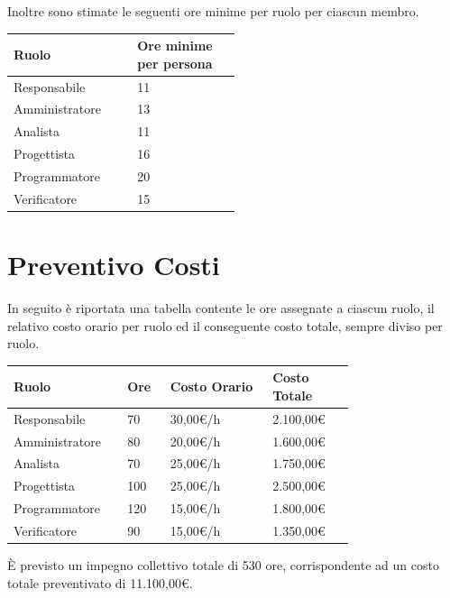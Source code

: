 \documentclass[a4paper,12pt]{article}
\begin{document}
Inoltre sono stimate le seguenti ore minime per ruolo per ciascun membro.
\space
\begin{center}
    \small
    \renewcommand{\arraystretch}{1.2}
    \begin{tabular}{|p{0.20\linewidth}|p{0.30\linewidth}|}
        \hline
        \rowcolor{gray!60}
        \textbf{Ruolo} & \textbf{Ore minime per persona}\\
        \hline
        \rowcolor{white}
        Responsabile & 11 \\
        \hline
        \rowcolor{gray!20}
        Amministratore & 13 \\
        \hline
        \rowcolor{white}
        Analista & 11 \\
        \hline
        \rowcolor{gray!20}
        Progettista & 16 \\
        \hline
        \rowcolor{white}
        Programmatore & 20 \\
        \hline
        \rowcolor{gray!20}
        Verificatore & 15 \\
        \hline
    \end{tabular}
\end{center}
\section{Preventivo Costi}
In seguito è riportata una tabella contente le ore assegnate a ciascun ruolo, il relativo costo orario per ruolo ed il conseguente costo totale, sempre diviso per ruolo.
\begin{center}
    \small
    \renewcommand{\arraystretch}{1.2} 
    \begin{tabular}{|p{0.20\linewidth}|p{0.10\linewidth}|p{0.25\linewidth}|p{0.20\linewidth}|}
        \hline
        \rowcolor{gray!60} 
        \textbf{Ruolo} & \textbf{Ore} & \textbf{Costo Orario} & \textbf{Costo Totale} \\
        \hline
        \rowcolor{white}
        Responsabile & 70 & 30,00€/h & 2.100,00€\\
        \hline
        \rowcolor{gray!20}
        Amministratore & 80 & 20,00€/h & 1.600,00€\\
        \hline
        \rowcolor{white}
        Analista & 70 & 25,00€/h & 1.750,00€\\
        \hline
        \rowcolor{gray!20}
        Progettista & 100 & 25,00€/h & 2.500,00€\\
        \hline
        \rowcolor{white}
        Programmatore & 120 & 15,00€/h & 1.800,00€\\
        \hline
        \rowcolor{gray!20}
        Verificatore & 90 & 15,00€/h & 1.350,00€\\
        \hline
    \end{tabular}
\end{center}
È previsto un impegno collettivo totale di 530 ore, corrispondente ad un costo totale preventivato di 11.100,00€. 
\end{document}
